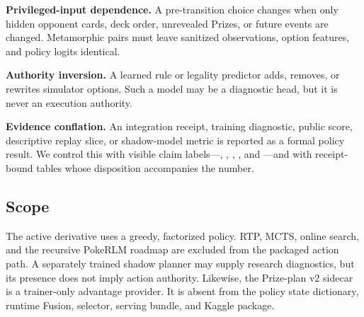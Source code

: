 \textbf{Privileged-input dependence.} A pre-transition choice changes when
only hidden opponent cards, deck order, unrevealed Prizes, or future events are
changed. Metamorphic pairs must leave sanitized observations, option features,
and policy logits identical.

\textbf{Authority inversion.} A learned rule or legality predictor adds,
removes, or rewrites simulator options. Such a model may be a diagnostic head,
but it is never an execution authority.

\textbf{Evidence conflation.} An integration receipt, training diagnostic,
public score, descriptive replay slice, or shadow-model metric is reported as a
formal policy result. We control this with visible claim labels---\Measured,
\Verified, \Configured, \Historical, and \NotMeasured---and with receipt-bound
tables whose disposition accompanies the number.

\subsection{Scope}

The active derivative uses a greedy, factorized policy. RTP, MCTS, online
search, and the recursive PokeRLM roadmap are excluded from the packaged action
path. A separately trained shadow planner may supply research diagnostics, but
its presence does not imply action authority. Likewise, the Prize-plan v2
sidecar is a trainer-only advantage provider. It is absent from the policy state
dictionary, runtime Fusion, selector, serving bundle, and Kaggle package.
